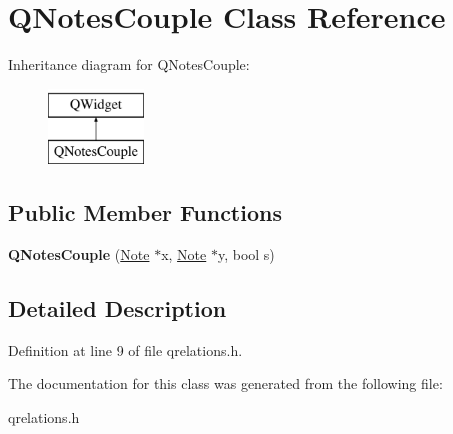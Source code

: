 \hypertarget{class_q_notes_couple}{}\section{Q\+Notes\+Couple Class Reference}
\label{class_q_notes_couple}
Inheritance diagram for Q\+Notes\+Couple\+:\begin{figure}[H]
\begin{center}
\leavevmode
\includegraphics[height=2.000000cm]{class_q_notes_couple}
\end{center}
\end{figure}
\subsection*{Public Member Functions}
\begin{DoxyCompactItemize}
\item 
\mbox{\label{class_q_notes_couple_a010fab55fb622f8959510ad50ff34502}} 
{\bfseries Q\+Notes\+Couple} (\hyperlink{class_note}{Note} $\ast$x, \hyperlink{class_note}{Note} $\ast$y, bool s)
\end{DoxyCompactItemize}


\subsection{Detailed Description}


Definition at line 9 of file qrelations.\+h.



The documentation for this class was generated from the following file\+:\begin{DoxyCompactItemize}
\item 
qrelations.\+h\end{DoxyCompactItemize}
